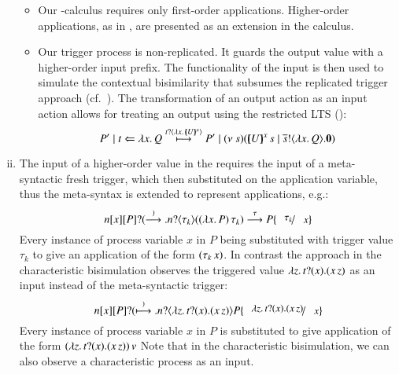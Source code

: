 \begin{enumerate}[i)]
\begin{itemize}
			\item	Our \HOp-calculus requires only first-order
				applications. Higher-order applications,
				as in \cite{JeffreyR05},
				are presented as an extension in the \HOpp
				calculus.

			\item	Our trigger process is non-replicated. 
				It guards the output
				value with a higher-order input prefix. The
				functionality of the input is then used to
				simulate the contextual bisimilarity that subsumes
				the replicated trigger approach (cf.~).
				The transformation of an output action as an input
				action allows for treating an output
				using the restricted LTS ():
				\[
					P' \Par \htrigger{t}{\abs{x}{Q}} \hby{\bactinp{t}{\abs{x}{\mapchar{U}{x}}}}
					P' \Par \news{s}{ (\appl{\mapchar{U}{x}}{s} \Par \bout{\dual{s}}{\abs{x}{Q}} \inact)}
				\]
		\end{itemize}

	\item	The input of a higher-order value in the \cite{JeffreyR05}
		requires 
		the input of a meta-syntactic fresh trigger, which then
		substituted on the application variable, thus the meta-syntax
		is extended to represent applications, e.g.:
		\[
			\inp{n}{x} P \by{\bactinp{n}{\tau_k}} (\appl{(\abs{x}{P})}{\tau_k}) \by{\tau} P \subst{\tau_k}{x} 
		\]
		Every instance of process variable $x$ in $P$ being substituted
		with trigger value $\tau_k$ to give an application of the form $(\tau_k\,x)$.
		In contrast the approach in the characteristic bisimulation observes the
		triggered value
		$\lambda z.\,t ? (x) . (x\,z)$ as an input instead of the
		meta-syntactic trigger:
		\[
			\inp{n}{x} P \hby{\bactinp{n}{\abs{z}\binp{t}{x} (\appl{x}{z})}} P \subst{\abs{z}\binp{t}{x} (\appl{x}{z})}{x}
		\]
		Every instance of process variable $x$ in $P$
		is substituted to give application of the form
		$(\lambda z.\,t ? (x) . (x\,z))\,v$
		Note that in the characteristic bisimulation, 
		we can also observe a characteristic process as an input.
		

\end{enumerate}
